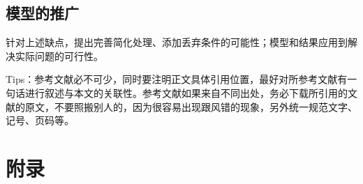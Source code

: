 \documentclass[12pt,utf8]{article}
\begin{document}
\subsection{模型的推广}
 针对上述缺点，提出完善简化处理、添加丢弃条件的可能性；模型和结果应用到解决实际问题的可行性。
 
 
\newpage


Tips：参考文献必不可少，同时要注明正文具体引用位置，最好对所参考文献有一句话进行叙述与本文的关联性。参考文献如果来自不同出处，务必下载所引用的文献的原文，不要照搬别人的，因为很容易出现跟风错的现象，另外统一规范文字、记号、页码等。

\clearpage

\section*{附录}

\appendix
\end{document}
